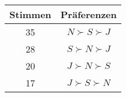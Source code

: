 \begin{tabular}{c|c}
	Stimmen & Präferenzen \\
	\hline
	35 & $ N \succ S \succ J $\\ 
	28 & $ S \succ N \succ J $ \\
	20 & $ J \succ N \succ S $ \\
	17 & $ J \succ S \succ N $ \\
	\end{tabular}